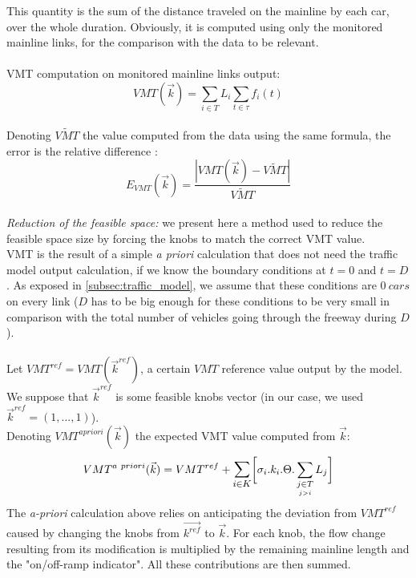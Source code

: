 This quantity is the sum of the distance traveled on the mainline by each car, over the whole duration.
Obviously, it is computed using only the monitored mainline links, for the comparison with the data to be relevant.\\
\\
VMT computation on monitored mainline links output:
\begin{equation*}
	 VMT(\vec{k})=\sum_{i\in{T}}L_{i}\sum_{t\in \tau}f_{i}(t)
\end{equation*}
\\
Denoting $\widetilde{VMT}$ the value computed from the data using the same formula, the error is the relative difference :
\begin{equation*}
	E_{VMT}(\vec{k})=\frac{|VMT(\vec{k})-\widetilde{VMT}|}{\widetilde{VMT}}
\end{equation*}
~\\
\emph{Reduction of the feasible space:} we present here a method used to reduce the feasible space size by forcing the knobs to match the correct VMT value.\\
VMT is the result of a simple \emph{a priori} calculation that does not need the traffic model output calculation, if we know the boundary conditions at $t=0$ and $t=D$. As exposed in \ref{subsec:traffic_model}, we assume that these conditions are $0\ cars$ on every link ($D$ has to be big enough for these conditions to be very small in comparison with the total number of vehicles going through the freeway during $D$).\\
\\
Let $VMT^{ref}=VMT(\vec{k}^{ref})$, a certain $VMT$ reference value output by the model. We suppose that $\vec{k}^{ref}$ is some feasible knobs vector (in our case, we used $\vec{k}^{ref}=(1,...,1)$).\\
Denoting $VMT^{a priori}(\vec{k})$ the expected VMT value computed from $\vec{k}$:\\
\begin{equation}
	\label{eq:TVMapriori}
	VMT^{a\ priori}(\vec{k})=VMT^{ref}+\mathlarger{\sum\limits_{i\in K}}\biggl[\sigma_{i}.k_{i}.\Theta.	\sum\limits_{\underset{j>i}{j\in T}}L_{j}\biggr]
\end{equation}	
The \emph{a-priori} calculation above relies on anticipating the deviation from $VMT^{ref}$ caused by changing the knobs from $\vec{k^{ref}}$ to $\vec{k}$. For each knob, the flow change resulting from its modification is multiplied by the remaining mainline length and the "on/off-ramp indicator". All these contributions are then summed.\\
